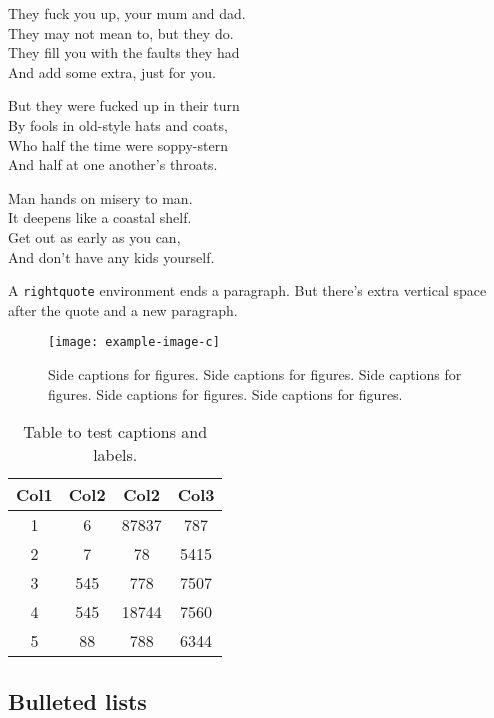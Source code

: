 \documentclass{article}
\begin{document}
\begin{rightquote}
They fuck you up, your mum and dad.\\
  They may not mean to, but they do.\\
They fill you with the faults they had\\
  And add some extra, just for you.

But they were fucked up in their turn\\
  By fools in old-style hats and coats,\\
Who half the time were soppy-stern\\
  And half at one another's throats.

Man hands on misery to man.\\
  It deepens like a coastal shelf.\\
Get out as early as you can,\\
  And don't have any kids yourself.

\end{rightquote}\par

A \verb|rightquote| environment ends a paragraph.
But there's extra vertical space after the quote and a new paragraph.

\begin{SCfigure}
  \texttt{[image: example-image-c]}
  \caption{Side captions for figures.
Side captions for figures.
Side captions for figures.
Side captions for figures.
Side captions for figures.}
\end{SCfigure}

\begin{table}
\centering
\begin{tabular}{|c|c|c|c|}
 \hline
 Col1 & Col2 & Col2 & Col3 \\
 \hline
 \hline
 1 & 6 & 87837 & 787 \\
 2 & 7 & 78 & 5415 \\
 3 & 545 & 778 & 7507 \\
 4 & 545 & 18744 & 7560 \\
 5 & 88 & 788 & 6344 \\
 \hline
\end{tabular}
\caption{Table to test captions and labels.}
\label{table:1}
\end{table}

\subsection{Bulleted lists}
\end{document}
